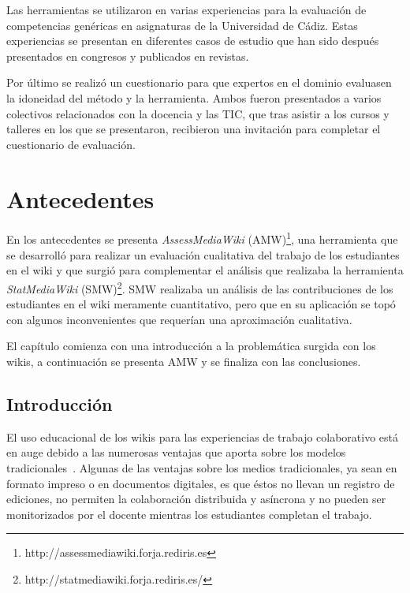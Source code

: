 Las herramientas se utilizaron en varias experiencias para la evaluación de competencias genéricas en asignaturas de la Universidad de Cádiz. Estas experiencias se presentan en diferentes casos de estudio que han sido después presentados en congresos y publicados en revistas.

Por último se realizó un cuestionario para que expertos en el dominio evaluasen la idoneidad del método y la herramienta. Ambos fueron presentados a varios colectivos relacionados con la docencia y las TIC, que tras asistir a los cursos y talleres en los que se presentaron, recibieron una invitación para completar el cuestionario de evaluación.


\section{Antecedentes} \label{subcha:antecedentes}

En los antecedentes se presenta \emph{AssessMediaWiki} (AMW)\footnote{http://assessmediawiki.forja.rediris.es}, una herramienta que se desarrolló para realizar un evaluación cualitativa del trabajo de los estudiantes en el wiki y que surgió para complementar el análisis que realizaba la herramienta \emph{StatMediaWiki} (SMW)\footnote{http://statmediawiki.forja.rediris.es/}. SMW realizaba un análisis de las contribuciones de los estudiantes en el wiki meramente cuantitativo, pero que en su aplicación se topó con algunos inconvenientes que requerían una aproximación cualitativa.

El capítulo comienza con una introducción a la problemática surgida con los wikis, a continuación se presenta AMW y se finaliza con las conclusiones.


\subsection{Introducción}

	El uso educacional de los wikis para las experiencias de trabajo colaborativo está en auge debido a las numerosas ventajas que aporta sobre los modelos tradicionales~\cite{elgort2008wiki}. Algunas de las ventajas sobre los medios tradicionales, ya sean en formato impreso o en documentos digitales, es que éstos no llevan un registro de ediciones, no permiten la colaboración distribuida y asíncrona y no pueden ser monitorizados por el docente mientras los estudiantes completan el trabajo.

